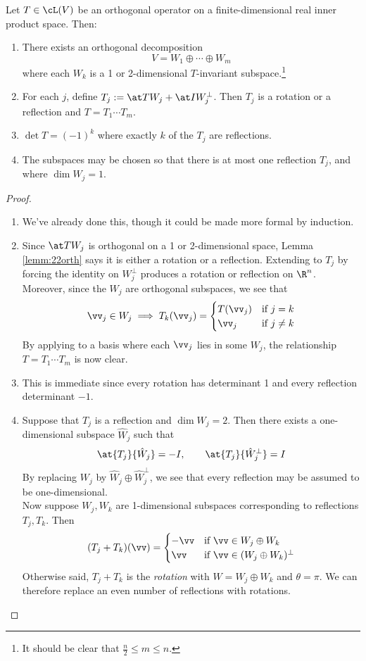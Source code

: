 \begin{thm}{}{}
Let $T\in\cL(V)$ be an orthogonal operator on a finite-dimensional real inner product space. Then:
\begin{enumerate}
  \item There exists an orthogonal decomposition
	\[V= W_1\oplus\cdots \oplus W_m\]
	where each $W_k$ is a 1 or 2-dimensional $T$-invariant subspace.\footnote{It should be clear that $\frac n2\le m\le n$.}
	\item For each $j$, define $T_j:=\at T{W_j}+\at I{W_j^\perp}$. Then $T_j$ is a rotation or a reflection and $T=T_1\cdots T_m$.
	\item $\det T=(-1)^k$ where exactly $k$ of the $T_j$ are reflections.
	\item The subspaces may be chosen so that there is at most one reflection $T_j$, and where $\dim W_j=1$.
\end{enumerate}
\end{thm}

\begin{proof}
\begin{enumerate}
  \item We've already done this, though it could be made more formal by induction.
  \item Since $\at T{W_j}$ is orthogonal on a 1 or 2-dimensional space, Lemma \ref{lemm:22orth} says it is either a rotation or a reflection. Extending to $T_j$ by forcing the identity on $W_j^\perp$ produces a rotation or reflection on $\R^n$. Moreover, since the $W_j$ are orthogonal subspaces, we see that
  \[\vv_j\in W_j\implies T_k(\vv_j)=\begin{cases}
  T(\vv_j)&\text{if $j=k$}\\
  \vv_j&\text{if $j\neq k$}
  \end{cases}\]
  By applying to a basis where each $\vv_j$ lies in some $W_j$, the relationship $T=T_1\cdots T_m$ is now clear.
  \item This is immediate since every rotation has determinant 1 and every reflection determinant $-1$.
  \item Suppose that $T_j$ is a reflection and $\dim W_j=2$. Then there exists a one-dimensional subspace $\hat W_j$ such that
  \[\at{T_j}{\hat W_j}=-I,\qquad \at{T_j}{\hat W_j^\perp}=I\]
  By replacing $W_j$ by $\hat W_j\oplus \hat W_j^\perp$, we see that every reflection may be assumed to be one-dimensional.\\
  Now suppose $W_j,W_k$ are 1-dimensional subspaces corresponding to reflections $T_j,T_k$. Then
  \[(T_j+T_k)(\vv)=\begin{cases}
  -\vv&\text{if $\vv\in W_j\oplus W_k$}\\
  \vv&\text{if $\vv\in (W_j\oplus W_k)^\perp$}
  \end{cases}\]
  Otherwise said, $T_j+T_k$ is the \emph{rotation} with $W=W_j\oplus W_k$ and $\theta=\pi$. We can therefore replace an even number of reflections with rotations.\qedhere
\end{enumerate}
\end{proof}



